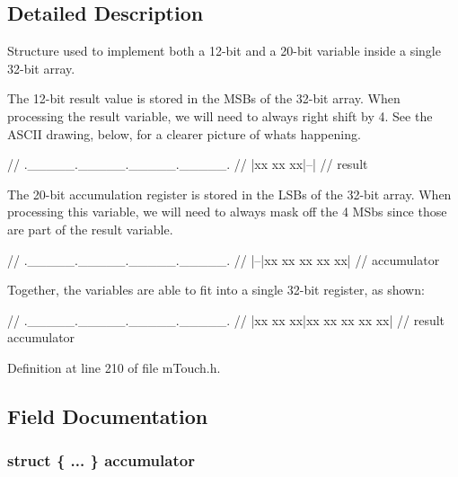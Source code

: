 \subsection{Detailed Description}
Structure used to implement both a 12-\/bit and a 20-\/bit variable inside a single 32-\/bit array. 

The 12-\/bit result value is stored in the M\+S\+Bs of the 32-\/bit array. When processing the \textquotesingle{}result\textquotesingle{} variable, we will need to always right shift by 4. See the A\+S\+C\+I\+I drawing, below, for a clearer picture of what\textquotesingle{}s happening.


\begin{DoxyCode}
\textcolor{comment}{// .\_\_\_\_\_.\_\_\_\_\_.\_\_\_\_\_.\_\_\_\_\_.}
\textcolor{comment}{// |xx xx xx|--|}
\textcolor{comment}{//  result  }
\end{DoxyCode}


The 20-\/bit accumulation register is stored in the L\+S\+Bs of the 32-\/bit array. When processing this variable, we will need to always mask off the 4 M\+Sbs since those are part of the result variable.


\begin{DoxyCode}
\textcolor{comment}{//  .\_\_\_\_\_.\_\_\_\_\_.\_\_\_\_\_.\_\_\_\_\_.}
\textcolor{comment}{//        |--|xx xx xx xx xx|}
\textcolor{comment}{//               accumulator}
\end{DoxyCode}


Together, the variables are able to fit into a single 32-\/bit register, as shown\+:


\begin{DoxyCode}
\textcolor{comment}{// .\_\_\_\_\_.\_\_\_\_\_.\_\_\_\_\_.\_\_\_\_\_.}
\textcolor{comment}{// |xx xx xx|xx xx xx xx xx|}
\textcolor{comment}{//  result      accumulator}
\end{DoxyCode}
 

Definition at line 210 of file m\+Touch.\+h.



\subsection{Field Documentation}
\hypertarget{unionm_touch___acquisition_data_a7b21f05f3c5dab574b956e7a6429f403}{}
\subsubsection[{accumulator}]{\setlength{\rightskip}{0pt plus 5cm}struct \{ ... \}   accumulator}\label{unionm_touch___acquisition_data_a7b21f05f3c5dab574b956e7a6429f403}


